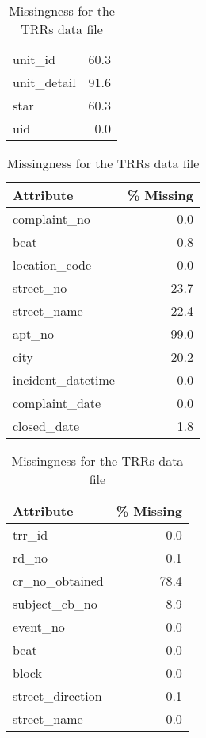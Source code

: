 \begin{table}[h]
\begin{minipage}[t]{0.48\textwidth}
\begin{tabular}{lr}
             unit\_id &       60.3 \\
         unit\_detail &       91.6 \\
                star &       60.3 \\
                 uid &        0.0 \\
\bottomrule
\end{tabular}
\vspace{2\baselineskip}
\caption{Missingness for the Complaints data file}
\begin{tabular}{lr}
\toprule
        Attribute &  \% Missing \\
\midrule
     complaint\_no &        0.0 \\
             beat &        0.8 \\
    location\_code &        0.0 \\
        street\_no &       23.7 \\
      street\_name &       22.4 \\
           apt\_no &       99.0 \\
             city &       20.2 \\
incident\_datetime &        0.0 \\
   complaint\_date &        0.0 \\
      closed\_date &        1.8 \\
\bottomrule
\end{tabular}
\end{minipage}\hfill
\begin{minipage}[t]{0.5\textwidth}
\caption{Missingness for the TRRs data file}
\centering 
\begin{tabular}{lr}
\toprule
                   Attribute &  \% Missing \\
\midrule
                      trr\_id &        0.0 \\
                       rd\_no &        0.1 \\
              cr\_no\_obtained &       78.4 \\
               subject\_cb\_no &        8.9 \\
                    event\_no &        0.0 \\
                        beat &        0.0 \\
                       block &        0.0 \\
            street\_direction &        0.1 \\
                 street\_name &        0.0 \\

\end{tabular}
\end{minipage}
\end{table}
